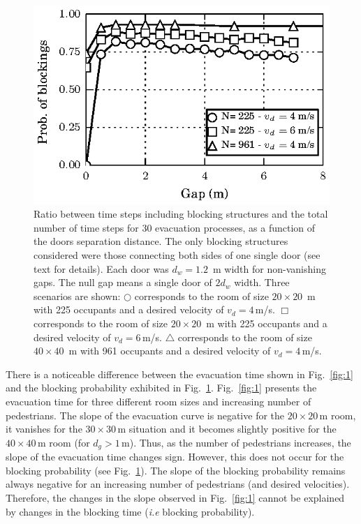 \begin{figure}
\includegraphics[width=\columnwidth]{./fig13.eps}
\caption{\label{fig:15} Ratio between time steps including blocking structures 
and the total number of time steps for 30 evacuation processes, as a function 
of the doors separation distance. The only blocking structures considered 
were those connecting both sides of one single door (see text for details). 
Each door was $d_w=1.2$~m width for non-vanishing gaps. The null gap means a 
single door of $2d_w$ width. Three scenarios are shown: $\bigcirc$ 
corresponds to the room of size $20\times20$~m with 225 occupants and a 
desired velocity of $v_d=4\,$m/s. $\Box$ corresponds to the room of size  
$20\times20$~m with 225 occupants and a desired velocity of $v_d=6\,$m/s. 
$\bigtriangleup$ corresponds to the room of size $40\times40$~m with 961 
occupants and a desired velocity of $v_d=4\,$m/s.   }
\end{figure}

There is a noticeable difference between the evacuation time 
shown in Fig.~\ref{fig:1} and the blocking probability exhibited in 
Fig.~\ref{fig:15}. Fig.~\ref{fig:1} presents the evacuation time for three 
different room sizes and increasing number of pedestrians.  The slope of the 
evacuation curve is negative for the $20\times20\,$m room, it vanishes for 
the $30\times30\,$m situation and it becomes slightly positive for the 
$40\times40\,$m room (for $d_g>1\,$m). Thus, as the number of pedestrians 
increases, the slope of the evacuation time changes sign. However, this does not 
occur for the blocking probability (see Fig.~\ref{fig:15}). The slope of the 
blocking probability remains always negative for an increasing number of 
pedestrians (and desired velocities). Therefore, the changes in the slope 
observed in Fig.~\ref{fig:1} cannot be explained by changes in the blocking 
time (\textit{i.e} blocking probability).   \\

